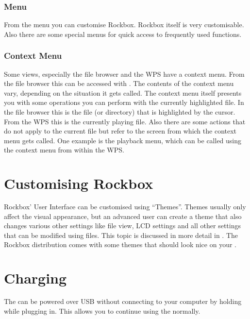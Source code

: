 \subsubsection{Menu}
From the menu you can customise Rockbox. Rockbox itself is very customisable.
Also there are some special menus for quick access to frequently used
functions.

\subsubsection{Context Menu}
Some views, especially the file browser and the WPS have a context menu.
From the file browser this can be accessed with \ActionStdContext{}.
The contents of the context menu vary, depending on the situation it gets
called. The context menu itself presents you with some operations you can
perform with the currently highlighted file. In the file browser this is
the file (or directory) that is highlighted by the cursor. From the WPS this is
the currently playing file. Also there are some actions that do not apply
to the current file but refer to the screen from which the context menu
gets called. One example is the playback menu, which can be called using
the context menu from within the WPS.

\section{Customising Rockbox}
Rockbox' User Interface can be customised using ``Themes''. Themes usually
only affect the visual appearance, but an advanced user can create a theme
that also changes various other settings like file view, LCD settings and
all other settings that can be modified using  files. This topic
is discussed in more detail in .
The Rockbox distribution comes with some themes that should look nice on
your \dap{}.

{
    \section{Charging}

    The \dap{} can be powered over USB without connecting to your
    computer by holding \ActionStdUsbCharge{} while plugging in. This
    allows you to continue using the \dap{} normally.
}


